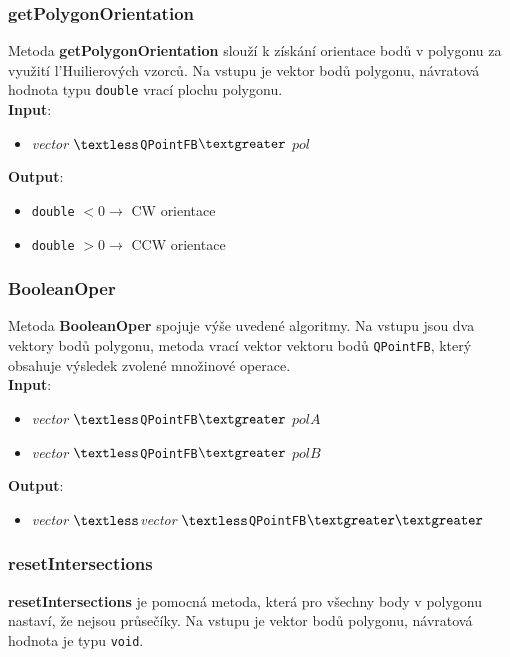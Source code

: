 \documentclass[a4paper, 12pt]{article}
\begin{document}
\subsubsection*{getPolygonOrientation}
Metoda \textbf{getPolygonOrientation} slouží k získání orientace bodů v polygonu za využití l'Huilierových vzorců. Na vstupu je vektor bodů polygonu, návratová hodnota typu \texttt{double} vrací plochu polygonu.\\

\textbf{Input}:
\begin{itemize}
\item \textsl{vector} $\textless$\texttt{QPointFB}$\textgreater$ $pol$
\end{itemize}

\textbf{Output}:
\begin{itemize}
\item \texttt{double} $< 0 \rightarrow$ CW orientace
\item \texttt{double} $> 0 \rightarrow$ CCW orientace
\end{itemize}

\subsubsection*{BooleanOper}
Metoda \textbf{BooleanOper} spojuje výše uvedené algoritmy. Na vstupu jsou dva vektory bodů polygonu, metoda vrací vektor vektoru bodů \texttt{QPointFB}, který obsahuje výsledek zvolené množinové operace.\\

\textbf{Input}:
\begin{itemize}
\item \textsl{vector} $\textless$\texttt{QPointFB}$\textgreater$ $polA$
\item \textsl{vector} $\textless$\texttt{QPointFB}$\textgreater$ $polB$
\end{itemize}

\textbf{Output}:
\begin{itemize}
\item \textsl{vector} $\textless$\textsl{vector} $\textless$\texttt{QPointFB}$\textgreater \textgreater$
\end{itemize}

\subsubsection*{resetIntersections}
\textbf{resetIntersections} je pomocná metoda, která pro všechny body v polygonu nastaví, že nejsou průsečíky. Na vstupu je vektor bodů polygonu, návratová hodnota je typu \texttt{void}.\\
\end{document}
